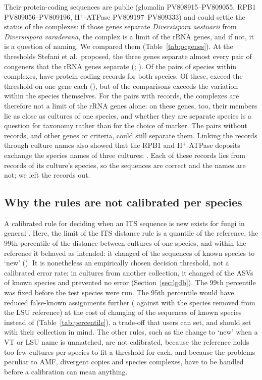\documentclass[11pt]{article}
\newcommand{\spn}[1]{\emph{#1}}   %
\begin{document}
Their protein-coding sequences are public (glomalin PV808915--PV809055, RPB1 PV809056--PV809196, H$^+$-ATPase
PV809197--PV809333) and could settle the status of the complexes: if those genes separate \spn{Diversispora
aestuarii} from \spn{Diversispora varaderana}, the complex is a limit of the rRNA genes, and if not, it is a question
of naming. We compared them (Table~\ref{tab:pcgenes}). At the thresholds Stefani et al.\ proposed, the three genes
separate almost every pair of congeners that the rRNA genes separate (\PcBaseline{}; \PcBaselinePct{}). Of the
\PcComplexPairsAll{} pairs of species within complexes, \PcComplexPairsN{} have protein-coding records for both
species. Of these, \PcComplexAboveN{} exceed the threshold on one gene each (\PcComplexAbove{}), but
\PcComplexCleanText{} of the \PcComplexComparisons{} comparisons exceeds the variation within the species
themselves. For the pairs with records, the complexes are therefore not a limit of the rRNA genes alone: on these
genes, too, their members lie as close as cultures of one species, and whether they are separate species is a
question for taxonomy rather than for the choice of marker. The pairs without records, and other genes or criteria,
could still separate them. Linking the records through culture names also showed that the RPB1 and H$^+$-ATPase
deposits exchange the species names of three cultures: \PcConflictDetail{}. Each of these records lies
\PcConflictNearest{} from records of its culture's species, so the sequences are correct and the names are not; we
left the \PcConflicts{} records out.

\subsection{Why the rules are not calibrated per species}
A calibrated rule for deciding when an ITS sequence is new exists for fungi in general \cite{obrien2026flag}. Here, the
limit of the ITS distance rule is a quantile of the reference, the 99th percentile of the distance between cultures
of one species, and within the reference it behaved as intended: it changed \ITSDemotedKnown{} of the \KnownN{}
sequences of known species to `new' (\ITSDemotedKnownPct{}). It is nonetheless an empirically chosen decision
threshold, not a calibrated error rate: in cultures from another collection, it changed \CiLgDemotedPct{} of the ASVs
of known species and prevented no error (Section~\ref{sec:lgdb}). The 99th percentile was fixed before the test species
were run. The 95th percentile would have reduced false-known assignments further (\PctNinetyFiveFKPct{} against
\PctNinetyNineFKPct{} with the species removed from the LSU reference) at the cost of changing
\PctNinetyFiveKnownDemotedPct{} of the sequences of known species instead of \PctNinetyNineKnownDemotedPct{}
(Table~\ref{tab:percentile}), a trade-off that users can set, and should set with their collection in mind. The other
rules, such as the change to `new' when a VT or LSU name is unmatched, are not calibrated, because the reference holds
too few cultures per species to fit a threshold for each, and because the problems peculiar to AMF, divergent copies
and species complexes, have to be handled before a calibration can mean anything.
\end{document}

